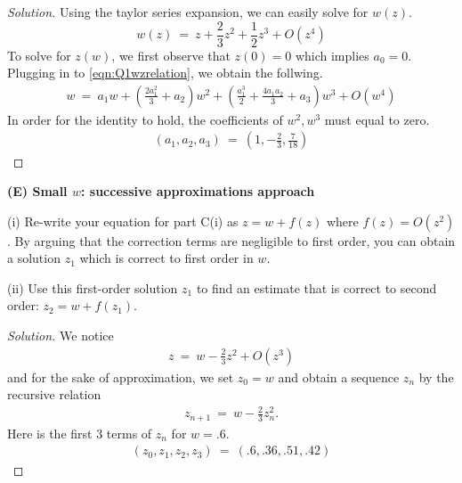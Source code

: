\documentclass{article}
\numberwithin{equation}{section}
\begin{document}
\begin{proof}[Solution]
    Using the taylor series expansion, we can easily solve for $w(z)$. 
    \begin{equation}
        w(z) \ = \ z + \frac 2 3 z^2 + \frac 1 2 z^3 + O(z^4)
    \end{equation}
    To solve for $z(w)$, we first observe that $z(0) = 0$ which implies 
    $a_0 = 0$. Plugging in to \eqref{eqn:Q1wzrelation}, we obtain the follwing. 
    \begin{eqnarray}
        w \ = \ 
        a_1 w + \left(
            \frac {2 a_1^2} 3 + a_2
        \right)w^2 + 
        \left(
            \frac {a_1^3} 2 + \frac {4a_1 a_2}3 + a_3
        \right)w^3 + O(w^4)
    \end{eqnarray}
    In order for the identity to hold, the coefficients of 
    $w^2, w^3$ must equal to zero. 
    \begin{eqnarray}
        (a_1, a_2, a_3) \ = \ \left(
            1, -\frac 2 3, \frac 7 {18}
        \right)
    \end{eqnarray}
\end{proof}


\textbf{(E) Small $w$: successive approximations approach}

(i) Re-write your equation for part C(i) as $z = w + f(z)$ where $f(z) = O(z^2)$. By arguing that the correction terms are negligible to first order, you can obtain a solution $z_1$ which is correct to first order in $w$.

(ii) Use this first-order solution $z_1$ to find an estimate that is correct to second order: $z_2 = w + f(z_1)$.

\begin{proof}[Solution]
    We notice 
    \begin{eqnarray}\label{eqn:Q1E}
        z \ = \ w - \frac 2 3 z^2 + O(z^3)
    \end{eqnarray}
    and for the sake of approximation, we set $z_0 = w$ and obtain a 
    sequence $z_n$ by the recursive relation 
    \begin{eqnarray}
        z_{n + 1} \ = \ w - \frac 2 3 z_n^2. 
    \end{eqnarray}
    Here is the first 3 terms of $z_n$ for $w = .6$. 
    \begin{eqnarray}
        (z_0, z_1, z_2, z_3) \ = \ (.6, .36, .51, .42)
    \end{eqnarray}

    
\end{proof}
\end{document}
